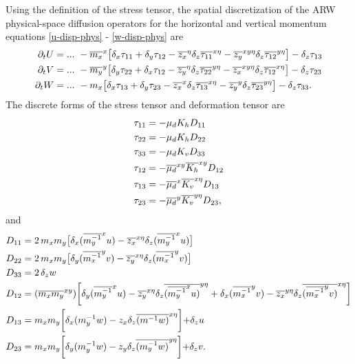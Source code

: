 Using the definition of the stress tensor, the spatial discretization of the
ARW physical-space diffusion operators for the horizontal and vertical
momentum equations
\eqref{u-disp-phys} - \eqref{w-disp-phys} are
%
\begin{align}
\partial_t U &= ...\,\,
- {\overline{m_x}}^x \bigl[ \delta_x \tau_{11} + \delta_y \tau_{12} 
- \overline{z_x}^{\eta} \delta_z 
{\overline{\tau_{11}}}^{x\eta} - {\overline {z_y}}^{xy\eta} \delta_z 
{\overline{\tau_{12}}}^{y\eta} \bigr]
-\delta_z \tau_{13}
\notag \\
%
\partial_t V &= ...\,\,
- {\overline{m_y}}^y \bigl[ \delta_y \tau_{22} + \delta_x \tau_{12} 
- \overline{z_y}^{\eta} \delta_z 
{\overline{\tau_{22}}}^{y\eta} - {\overline {z_x}}^{xy\eta} \delta_z
{\overline{\tau_{12}}}^{x\eta} \bigr]
-\delta_z \tau_{23}
\notag \\
%
\partial_t W &= ...\,\,
- m_x \bigl[ \delta_x \tau_{13} + \delta_y \tau_{23} 
- \overline {z_x}^{x} \delta_z 
{\overline{\tau_{13}}}^{x\eta} 
-{\overline {z_y}}^{y} \delta_z{\overline{\tau_{23}}}^{y\eta} 
\bigr]
- \delta_z \tau_{33}.
\notag
\end{align}
%
\noindent
The discrete forms of the stress tensor and deformation tensor are
\noindent
%
\begin{align}
\tau_{11} &= -\mu_d K_h D_{11} 
\notag \\
%
\tau_{22} &= -\mu_d K_h D_{22} 
\notag \\
%
\tau_{33} &= -\mu_d K_v D_{33} 
\notag \\
%
\tau_{12} &= -\overline {\mu_d}^{xy} 
\overline {K_h}^{xy} D_{12} 
\notag \\
%
\tau_{13} &= -\overline {\mu_d}^{x} 
\overline {K_v}^{x\eta} D_{13} 
\notag \\
%
\tau_{23} &= -\overline {\mu_d}^{y} 
\overline {K_v}^{y\eta} D_{23},
\notag
%
\end{align}
%
\noindent
and
%
\begin{align}
D_{11} &= 2 \, m_x m_y \bigl[ \delta_x ({\overline {m_y^{-1}}}^x u) 
- {\overline{z_x}}^{x\eta} \delta_z ({\overline {m_y^{-1}}}^x u) \bigl] 
\notag \\
%
D_{22} &= 2 \, m_x m_y \bigl[ \delta_y ({\overline {m_x^{-1}}}^y v) 
- {\overline{z_y}}^{x\eta} \delta_z ({\overline {m_x^{-1}}}^y v) \bigl] 
\notag \\
%
D_{33} &= 2 \, \delta_z w
\notag \\
%
D_{12} &= (\overline{m_x m_y}^{xy}) \biggl[ 
\delta_y ({\overline {m_y^{-1}}}^x u) 
- {\overline{z_y}}^{x\eta} 
\delta_z {\overline{({\overline {m_y^{-1}}}^x u)}^{y\eta}} 
+ \delta_x ({\overline {m_x^{-1}}}^y v) 
- {\overline{z_x}}^{y\eta}
\delta_z {\overline{({\overline {m_x^{-1}}}^y v)}^{x\eta}} 
\biggl] 
\notag \\
%
D_{13} &= m_x m_y \biggl[ 
\delta_x (m_y^{-1} w) 
- z_x \delta_z \overline{(m^{-1} w)}^{x\eta}
\biggl] 
+ \delta_z u
\notag \\
%
D_{23} &= m_x m_y \biggl[ 
\delta_y (m_y^{-1} w) 
- z_y \delta_z \overline{(m_y^{-1} w)}^{y\eta}
\biggl] 
+ \delta_z v.
\notag
%
\end{align}

